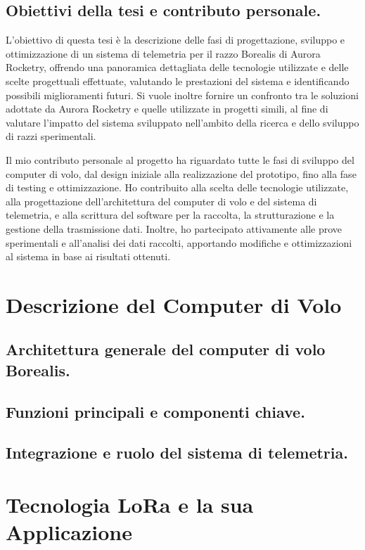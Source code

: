 \documentclass[12pt,a4paper,twoside]{book}
\begin{document}
\section{Obiettivi della tesi e contributo personale.}
L'obiettivo di questa tesi è la descrizione delle fasi di progettazione, 
sviluppo e ottimizzazione di un sistema di telemetria per il razzo Borealis di 
Aurora Rocketry, offrendo una panoramica dettagliata delle tecnologie utilizzate 
e delle scelte progettuali effettuate, valutando le prestazioni del sistema e 
identificando possibili miglioramenti futuri.
Si vuole inoltre fornire un confronto tra le soluzioni adottate da Aurora 
Rocketry e quelle utilizzate in progetti simili, al fine di valutare l'impatto 
del sistema sviluppato nell'ambito della ricerca e dello sviluppo di razzi 
sperimentali.

Il mio contributo personale al progetto ha riguardato tutte le fasi di sviluppo 
del computer di volo, dal design iniziale alla realizzazione del prototipo, fino 
alla fase di testing e ottimizzazione.
Ho contribuito alla scelta delle tecnologie utilizzate, alla progettazione 
dell'architettura del computer di volo e del sistema di telemetria, e alla 
scrittura del software per la raccolta, la strutturazione e la gestione della 
trasmissione dati.
Inoltre, ho partecipato attivamente alle prove sperimentali e all'analisi dei 
dati raccolti, apportando modifiche e ottimizzazioni al sistema in base ai 
risultati ottenuti.

\chapter{Descrizione del Computer di Volo} \label{chap:flight-computer}

\section{Architettura generale del computer di volo Borealis.}
\section{Funzioni principali e componenti chiave.}
\section{Integrazione e ruolo del sistema di telemetria.}

\chapter{Tecnologia LoRa e la sua Applicazione} \label{chap:lora}
\end{document}
